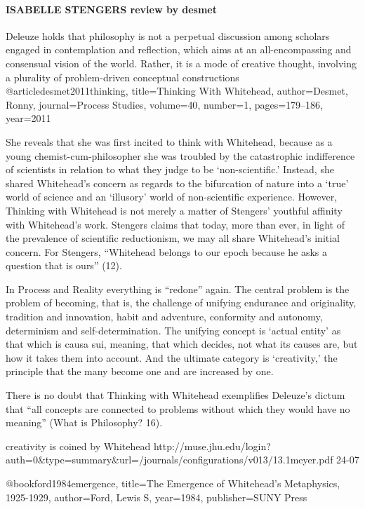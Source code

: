 \documentclass[a4paper]{Thesis}
\begin{document}
\paragraph{ISABELLE STENGERS review by desmet}
Deleuze holds that
philosophy is not a perpetual discussion among scholars engaged in contemplation
and reflection, which aims at an all-encompassing and consensual vision of the world.
Rather, it is a mode of creative thought, involving a plurality of problem-driven
conceptual constructions
\cite{keylist}
@article{desmet2011thinking,
	title={Thinking With Whitehead},
	author={Desmet, Ronny},
	journal={Process Studies},
	volume={40},
	number={1},
	pages={179--186},
	year={2011}
}

She reveals that she was first incited to think with Whitehead,
because as a young chemist-cum-philosopher she was troubled by the catastrophic
indifference of scientists in relation to what they judge to be ‘non-scientific.’ Instead,
she shared Whitehead’s concern as regards to the bifurcation of nature into a ‘true’
world of science and an ‘illusory’ world of non-scientific experience. However,
Thinking with Whitehead is not merely a matter of Stengers’ youthful affinity with
Whitehead’s work. Stengers claims that today, more than ever, in light of the
prevalence of scientific reductionism, we may all share Whitehead’s initial concern.
For Stengers, “Whitehead belongs to our epoch because he asks a question that is
ours” (12).

In Process and Reality everything is
“redone” again. The central problem is the problem of becoming, that is, the
challenge of unifying endurance and originality, tradition and innovation, habit and
adventure, conformity and autonomy, determinism and self-determination. The
unifying concept is ‘actual entity’ as that which is causa sui, meaning, that which
decides, not what its causes are, but how it takes them into account. And the ultimate
category is ‘creativity,’ the principle that the many become one and are increased by
one.


There is no doubt that Thinking with Whitehead exemplifies Deleuze’s dictum that
“all concepts are connected to problems without which they would have no meaning”
(What is Philosophy? 16).


creativity is coined by Whitehead 
\cite{steven meyer}
http://muse.jhu.edu/login?auth=0&type=summary&url=/journals/configurations/v013/13.1meyer.pdf
24-07

\cite{Ford}
@book{ford1984emergence,
	title={The Emergence of Whitehead's Metaphysics, 1925-1929},
	author={Ford, Lewis S},
	year={1984},
	publisher={SUNY Press}
}
\end{document}

